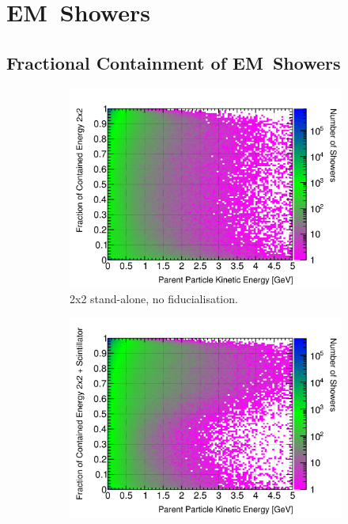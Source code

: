 \documentclass[10pt,a4paper,openany]{article}
\begin{document}
\clearpage
\section{EM~Showers}
\subsection{Fractional Containment of EM~Showers}
\begin{figure}[!htb]
	\centering
	\begin{subfigure}[b]{0.49\textwidth}
		\centering
		\includegraphics[width=1.0\textwidth]{EM_contained_frac_2x2.png}
		\caption{2x2 stand-alone, no fiducialisation.}
		\label{}
	\end{subfigure}	
	\hfill
	\begin{subfigure}[b]{0.49\textwidth}
		\centering
		\includegraphics[width=1.0\textwidth]{EM_contained_frac_2x2_Scintillator_gap.png}

\end{subfigure}
\end{figure}
\end{document}

